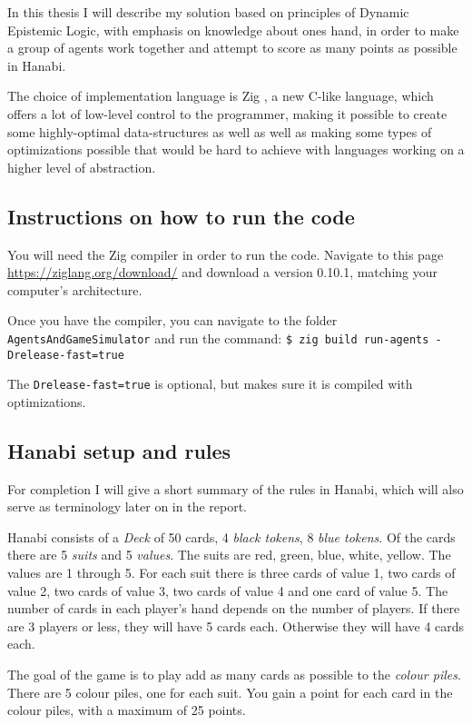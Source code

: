 In this thesis I will describe my solution based on principles of Dynamic Epistemic Logic, with emphasis on knowledge about ones hand, in order to make a group of agents work together and attempt to score as many points as possible in Hanabi. 

The choice of implementation language is Zig \cite{Ziglang}, a new C-like language, which offers a lot of low-level control to the programmer, making it possible to create some highly-optimal data-structures as well as well as making some types of optimizations possible that would be hard to achieve with languages working on a higher level of abstraction.



\subsection{Instructions on how to run the code}
You will need the Zig compiler in order to run the code. Navigate to this page \url{https://ziglang.org/download/} and download a version 0.10.1, matching your computer's architecture.

Once you have the compiler, you can navigate to the folder {\tt AgentsAndGameSimulator} and run the command: {\tt \$ zig build run-agents -Drelease-fast=true}

The {\tt Drelease-fast=true} is optional, but makes sure it is compiled with optimizations.



\subsection{Hanabi setup and rules}
For completion I will give a short summary of the rules in Hanabi, which will also serve as terminology later on in the report.

Hanabi consists of a \emph{Deck} of 50 cards, 4 \emph{black tokens}, 8 \emph{blue tokens}.  
Of the cards there are 5 \emph{suits} and 5 \emph{values}. 
The suits are red, green, blue, white, yellow. 
The values are 1 through 5. 
For each suit there is three cards of value 1, two cards of value 2, two cards of value 3, two cards of value 4 and one card of value 5.
The number of cards in each player's hand depends on the number of players. If there are 3 players or less, they will have 5 cards each. 
Otherwise they will have 4 cards each.

The goal of the game is to play add as many cards as possible to the \emph{colour piles}. 
There are 5 colour piles, one for each suit. 
You gain a point for each card in the colour piles, with a maximum of 25 points.

